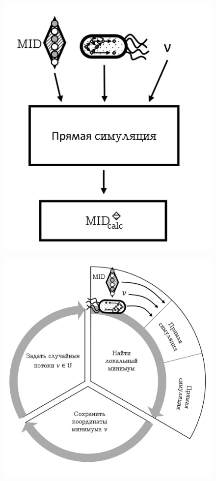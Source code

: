 \documentclass[14pt, a4paper]{extreport}
\begin{document}
\begin{figure}[t]
	\centering
	\begin{minipage}[l]{.5\textwidth}
		\centering
		\includegraphics[width=1\linewidth]{direct_simulation.png}
		\label{direct_simulation}
	\end{minipage}%
	\begin{minipage}[r]{.5\textwidth}
		\centering
		\includegraphics[width=1\linewidth]{inverse_problem.png}
		\label{inverse_problem}
	\end{minipage}
\end{figure}
\end{document}
